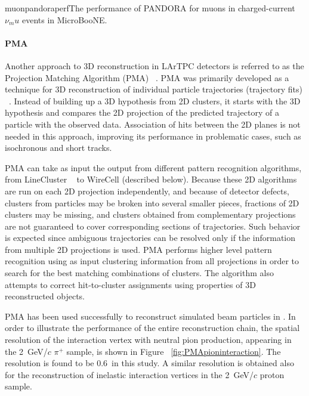 \begin{cdrfigure}{muonpandoraperf}{The performance of PANDORA for muons in charged-current
  $\nu_mu$ events in MicroBooNE. }
\end{cdrfigure}


\paragraph{PMA}
Another approach to 3D reconstruction in LArTPC detectors is referred to as the Projection Matching Algorithm
(PMA) ~\cite{pma_algorithm}. PMA was primarily developed as a technique for 3D reconstruction
of individual particle trajectories (trajectory fits) ~\cite{icarus3dreco}. Instead of
building up a 3D hypothesis from 2D clusters, it starts with the 3D hypothesis and compares
the 2D projection of the predicted trajectory of a particle with the observed data. Association
of hits between the 2D planes is not needed in this approach, improving its performance in
problematic cases, such as isochronous and short tracks.

PMA can take as input the output from different pattern recognition algorithms, from
LineCluster ~\cite{linecluster} to WireCell (described below).  Because these 2D algorithms
are run on each 2D projection independently, and because of detector defects,
clusters from  particles may be broken
into several smaller pieces, fractions of 2D clusters may be missing,
and clusters obtained from complementary projections are not guaranteed to cover corresponding
sections of trajectories. Such behavior is expected since ambiguous 
trajectories can be resolved only if the information from multiple 2D projections is used.
PMA performs higher level pattern recognition using as input clustering information from all
projections in order to search for the best matching combinations of clusters. The algorithm
also attempts to correct hit-to-cluster assignments using properties of 3D reconstructed objects.

PMA has been used successfully to reconstruct simulated beam particles in
\pdsp. In order to illustrate the performance of the entire reconstruction chain,
the spatial resolution of the interaction vertex with neutral pion
production, appearing in the 2~GeV/$c$ $\pi^+$ sample, is shown in Figure ~\ref{fig:PMApioninteraction}.
The resolution is found to be 0.6~\cm in this study.
A similar resolution is obtained also for the reconstruction
of inelastic interaction vertices in the 2~GeV/$c$ proton sample. 

